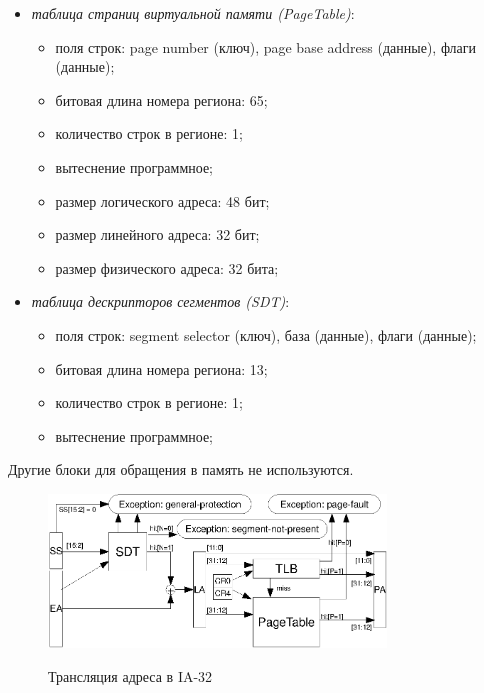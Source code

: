 \begin{itemize}
  \item \emph{таблица страниц виртуальной памяти (PageTable)}:
    \begin{itemize}
        \item поля строк: page number (ключ), page base address (данные), флаги
(данные);
        \item битовая длина номера региона: 65;
        \item количество строк в регионе: 1;
        \item вытеснение программное;
        \item размер логического адреса: 48 бит;
        \item размер линейного адреса: 32 бит;
        \item размер физического адреса: 32 бита;
    \end{itemize}


  \item \emph{таблица дескрипторов сегментов (SDT)}:
        \begin{itemize}
            \item поля строк: segment selector (ключ), база (данные), флаги
(данные);
            \item битовая длина номера региона: 13;
            \item количество строк в регионе: 1;
            \item вытеснение программное;
        \end{itemize}
\end{itemize}

Другие блоки для обращения в память не используются.

\begin{figure}[b] \center
  \includegraphics[width=0.8\textwidth]{4.analysis/ia32_addrtrans}\\
  \caption{Трансляция адреса в IA-32}\label{fig:ia32_address_translation}
\end{figure}

